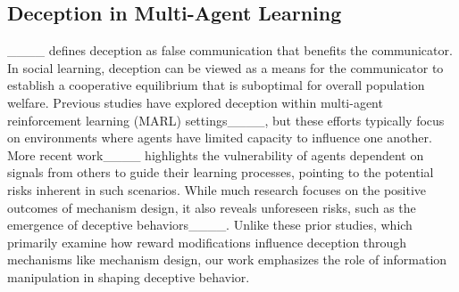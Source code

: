\subsection{Deception in Multi-Agent Learning}\label{sec:deception}


____ defines deception as false communication that benefits the communicator. 
In social learning, deception can be viewed as a means for the communicator to establish a cooperative equilibrium that is suboptimal for overall population welfare. 
Previous studies have explored deception within multi-agent reinforcement learning (MARL) settings____, but these efforts typically focus on environments where agents have limited capacity to influence one another. 
More recent work____ highlights the vulnerability of agents dependent on signals from others to guide their learning processes, pointing to the potential risks inherent in such scenarios. 
While much research focuses on the positive outcomes of mechanism design, it also reveals unforeseen risks, such as the emergence of deceptive behaviors____. 
Unlike these prior studies, which primarily examine how reward modifications influence deception through mechanisms like mechanism design, our work emphasizes the role of information manipulation in shaping deceptive behavior.


